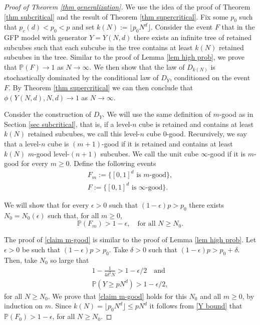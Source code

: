 \documentclass[11pt,a4paper]{article}
\newcommand{\pc}{\ensuremath{p_{c}(d)}}
\newcommand{\IP}{\ensuremath{\mathbb{P}}}
\theoremstyle{remark}
\begin{document}
\begin{proof}[Proof of Theorem \ref{thm generalization}]
We use the idea of the proof of Theorem \ref{thm subcritical} and the result of Theorem \ref{thm supercritical}. Fix some $p_0$ such that $\pc<p_0 < p$ and set $k(N):=\lfloor p_0 N^d \rfloor$. Consider the event $F$ that in the GFP model with generator $Y = Y(N,d)$ there exists an infinite tree of retained subcubes such that each subcube in the tree contains at least $k(N)$ retained subcubes in the tree. Similar to the proof of Lemma \ref{lem high prob}, we prove that $\IP(F)\to 1$ as $N\to\infty$. We then show that the law of $D_{k(N)}$ is stochastically dominated by the conditional law of $D_Y$, conditioned on the event $F$. By Theorem \ref{thm supercritical} we can then conclude that $\phi(Y(N,d),N,d) \to 1$ as $N \to \infty$. 


Consider the construction of $D_{Y}$. We will use the same definition of $m$-good as in Section \ref{sec subcritical}, that is, if a level-$n$ cube is retained and contains at least $k(N)$ retained subcubes, we call this level-$n$ cube 0-good. Recursively, we say that a level-$n$ cube is $(m+1)$-good if it is retained and contains at least $k(N)$ $m$-good level-$(n+1)$ subcubes. We call the unit cube $\infty$-good if it is $m$-good for every $m \geq 0$. Define the following events
\begin{eqnarray*}
 F_m:=\{[0,1]^d \text{ is }m\text{-good}\},\\
F:=\{[0,1]^d \text{ is }\infty\text{-good}\}.
\end{eqnarray*}


We will show that for every $\epsilon>0$ such that $(1-\epsilon)p > p_0$ there exists $N_0=N_0(\epsilon)$ such that, for all $m \geq 0$,
\begin{equation}\label{claim m-good}
\IP(F_m) > 1-\epsilon, \quad \text{for all } N \geq N_0 .
\end{equation}


The proof of \eqref{claim m-good} is similar to the proof of Lemma \ref{lem high prob}. Let $\epsilon>0$ be such that $(1-\epsilon)p > p_0$. Take $\delta>0$ such that $(1-\epsilon)p>p_0+\delta$. Then, take $N_0$ so large that
\begin{eqnarray}
 1 - \frac{1}{4\delta^2 N} > 1-\epsilon/2 \quad \text{and} \label{delta bound}\\
\IP(Y \geq p N^d) > 1-\epsilon/2 \label{Y bound},
\end{eqnarray}
for all $N\geq N_0$. We prove that \eqref{claim m-good} holds for this $N_0$ and all $m\geq 0$, by induction on $m$. Since $k(N) = \lfloor p_0 N^d \rfloor \leq pN^d$ it follows from \eqref{Y bound} that $\IP(F_0)>1-\epsilon$, for all $N\geq N_0$. 



\end{proof}
\end{document}
